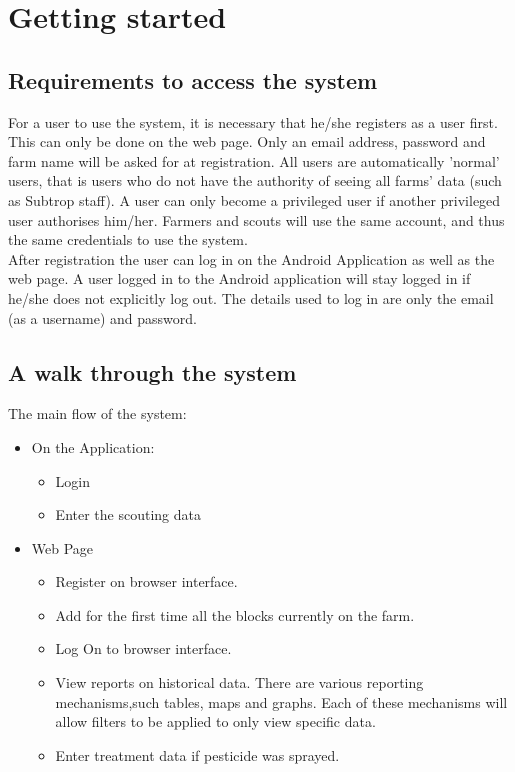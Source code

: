 \documentclass[11pt,a4paper,titlepage]{article}
\begin{document}
\section{Getting started}
\subsection{Requirements to access the system}
For a user to use the system, it is necessary that he/she registers as a user first. This can only be done on the web page. Only an email address, password and farm name will be asked for at registration. All users are automatically 'normal' users, that is users who do not have the authority of seeing all farms' data (such as Subtrop staff). A user can only become a privileged user if another privileged user authorises him/her. Farmers and scouts will use the same account, and thus the same credentials to use the system.\\
After registration the user can log in on the Android Application as well as the web page. A user logged in to the Android application will stay logged in if he/she does not explicitly log out. The details used to log in are only the email (as a username) and password.

\subsection{A walk through the system}


The main flow of the system:\\
\begin{itemize}
\item On the Application: 
	\begin{itemize}
		\item Login
		\item Enter the scouting data
	\end{itemize}
\item Web Page
	\begin{itemize}
		\item Register on browser interface.
		\item Add for the first time all the blocks currently on the farm.
		\item Log On to browser interface.
		\item View reports on historical data. There are various reporting mechanisms,such tables, maps and graphs. Each of these mechanisms will allow filters to be applied to only view specific data.
\item Enter treatment data if pesticide was sprayed.
	\end{itemize}
\end{itemize}
\end{document}
